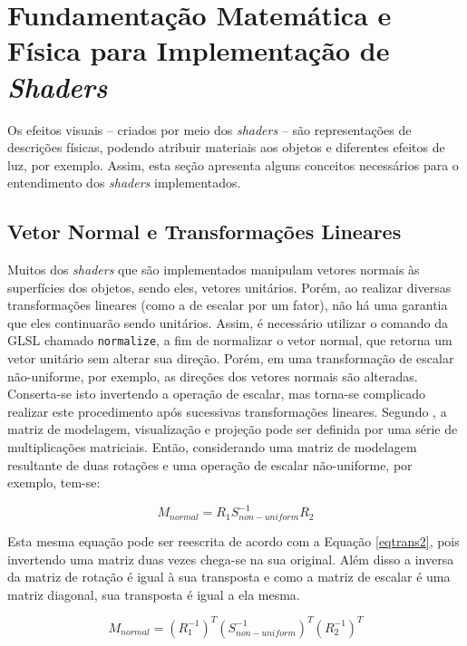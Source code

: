 \section{Fundamentação Matemática e Física para Implementação de \textit{Shaders}}
\label{teoria}

	Os efeitos visuais -- criados por meio dos \textit{shaders} -- são representações de descrições físicas, podendo atribuir materiais aos objetos e diferentes efeitos de luz, por exemplo. Assim, esta seção apresenta alguns conceitos necessários para o entendimento dos \textit{shaders} implementados.

	\subsection{Vetor Normal e Transformações Lineares}

	Muitos dos \textit{shaders} que são implementados manipulam vetores normais às superfícies dos objetos, sendo eles, vetores unitários. Porém, ao realizar diversas transformações lineares (como a de escalar por um fator), não há uma garantia que eles continuarão sendo unitários. Assim, é necessário utilizar o comando da GLSL chamado \texttt{normalize}, a fim de normalizar o vetor normal, que retorna um vetor unitário sem alterar sua direção. Porém, em uma transformação de escalar não-uniforme, por exemplo, as direções dos vetores normais são alteradas. Conserta-se isto invertendo a operação de escalar, mas torna-se complicado realizar este procedimento após sucessivas transformações lineares. Segundo  \cite{guha2011}, a matriz de modelagem, visualização e projeção pode ser definida por uma série de multiplicações matriciais. Então, considerando uma matriz de modelagem resultante de duas rotações e uma operação de escalar não-uniforme, por exemplo, tem-se:


	\begin{equation}
		M_ {normal} = R_ {1} S_ {non-uniform}^{-1} R_ {2}
	\label{eqtrans1}
	\end{equation}

	Esta mesma equação pode ser reescrita de acordo com a Equação \ref{eqtrans2}, pois invertendo uma matriz duas vezes chega-se na sua original. Além disso a inversa da matriz de rotação é igual à sua transposta e como a matriz de escalar é uma matriz diagonal, sua transposta é igual a ela mesma.

	\begin{equation}
		M_ {normal} = (R_ {1}^{-1})^{T} (S_ {non-uniform}^{-1})^{ T} (R_ {2}^{-1})^{T}
	\label{eqtrans2}
	\end{equation}

